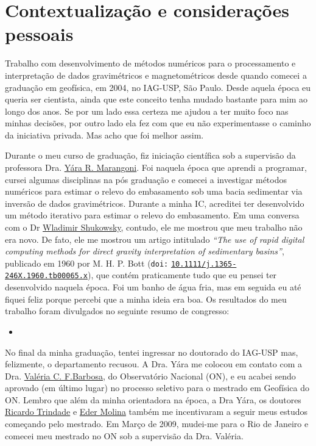 \section{Contextualização e considerações pessoais}
\label{sec:apresentacao-consideracoes}

Trabalho com desenvolvimento de métodos numéricos para o processamento e
interpretação de dados gravimétricos e magnetométricos desde quando comecei
a graduação em geofísica, em 2004, no IAG-USP, São Paulo.
Desde aquela época eu queria ser cientista, ainda que este conceito tenha mudado 
bastante para mim ao longo dos anos. Se por um lado essa certeza me ajudou a 
ter muito foco nas minhas decisões, por outro lado ela fez com que eu não experimentasse
o caminho da iniciativa privada. Mas acho que foi melhor assim.

Durante o meu curso de graduação, fiz iniciação
científica sob a supervisão da professora Dra. \href{https://lattes.cnpq.br/5050611044655332}{Y{\'a}ra R. Marangoni}. 
Foi naquela época que aprendi a programar, cursei algumas disciplinas na pós graduação e 
comecei a investigar métodos numéricos para estimar o relevo do embasamento sob uma bacia
sedimentar via inversão de dados gravimétricos. 
Durante a minha IC, acreditei ter desenvolvido um método iterativo para estimar o relevo do
embasamento. 
Em uma conversa com o Dr \href{https://lattes.cnpq.br/6171841822916587}{Wladimir Shukowsky}, contudo, ele me mostrou que meu trabalho não
era novo.
De fato, ele me mostrou um artigo intitulado 
\textit{``The use of rapid digital computing methods for direct gravity interpretation of sedimentary basins''}, publicado em 1960 por M. H. P. Bott (\texttt{doi:} \href{https://doi.org/10.1111/j.1365-246X.1960.tb00065.x}{\texttt{10.1111/j.1365-246X.1960.tb00065.x}}), que contém praticamente tudo que eu pensei ter desenvolvido naquela época.
Foi um banho de água fria, mas em seguida eu até fiquei feliz porque percebi que a minha
ideia era boa. Os resultados do meu trabalho foram divulgados no seguinte resumo de 
congresso:
\begin{itemize}
	\item {}
\end{itemize}

No final da minha graduação, tentei ingressar no doutorado do IAG-USP mas, felizmente,
o departamento recusou. A Dra. Y{\'a}ra me colocou em contato com a Dra. \href{https://lattes.cnpq.br/0391036221142471}{Valéria C. F.Barbosa}, do Observatório Nacional (ON), e eu acabei sendo aprovado (em último lugar)
no processo seletivo para o mestrado em Geofísica do ON. Lembro que além da minha
orientadora na época, a Dra Yára, os doutores \href{https://lattes.cnpq.br/3934334115083849}{Ricardo Trindade} e \href{https://lattes.cnpq.br/0921576804781499}{Eder Molina} também 
me incentivaram a seguir meus estudos começando pelo mestrado.
Em Março de 2009, mudei-me para o Rio de Janeiro e comecei meu mestrado no ON sob a
supervisão da Dra. Valéria.

